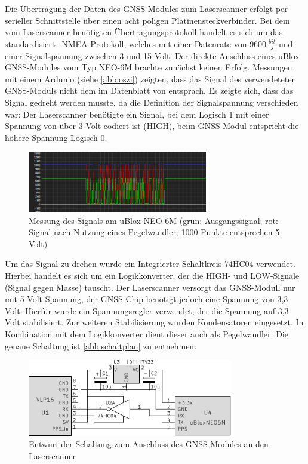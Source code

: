 \documentclass[a4paper,12pt,bibliography=totoc, listof=totoc,titlepage,pointlessnumbers]{scrreprt}
\begin{document}
Die Übertragung der Daten des GNSS-Modules zum Laser\-scan\-ner erfolgt per serieller Schnittstelle über einen acht poligen Platinensteckverbinder. Bei dem vom Laser\-scan\-ner benötigten Übertragungsprotokoll handelt es sich um das standardisierte NMEA-Protokoll, welches mit einer Datenrate von \(9600~\frac{bit}{s}\) und einer Signalspannung zwischen 3 und 15 Volt. Der direkte Anschluss eines uBlox GNSS-Modules vom Typ NEO-6M brachte zunächst keinen Erfolg. Messungen mit einem Ardunio (siehe \autoref{abb:oszi}) zeigten, dass das Signal des verwendeteten GNSS-Moduls nicht dem im Datenblatt von \citet[S. 3]{vlpInterface} entsprach. Es zeigte sich, dass das Signal gedreht werden musste, da die Definition der Signalspannung verschieden war: Der Laser\-scan\-ner benötigte ein Signal, bei dem Logisch 1 mit einer Spannung von über 3 Volt \citep[S. 3]{vlpInterface} codiert ist (HIGH), beim GNSS-Modul entspricht  die höhere Spannung Logisch 0.

\begin{figure}
 \centering
 \includegraphics[width=0.7\textwidth]{img/oszi.png}
 \caption{Messung des Signals am uBlox NEO-6M (grün: Ausgangssignal; rot: Signal nach Nutzung eines Pegelwandler; 1000 Punkte entsprechen 5 Volt)}
 \label{abb:oszi}
\end{figure}

Um das Signal zu drehen wurde ein Integrierter Schaltkreis 74HC04 verwendet. Hierbei handelt es sich um ein Logikkonverter, der die HIGH- und LOW-Signale (Signal gegen Masse) tauscht. Der Laser\-scan\-ner versorgt das GNSS-Modull nur mit 5 Volt Spannung, der GNSS-Chip benötigt jedoch eine Spannung von 3,3 Volt. Hierfür wurde ein Spannungsregler verwendet, der die Spannung auf 3,3 Volt stabilisiert. Zur weiteren Stabilisierung wurden Kondensatoren eingesetzt. In Kombination mit dem Logikkonverter dient dieser auch als Pegelwandler. Die genaue Schaltung ist \autoref{abb:schaltplan} zu entnehmen.

\begin{figure}
 \centering
 \includegraphics[width=0.8\textwidth]{img/schaltplanGnss.pdf}
 \caption{Entwurf der Schaltung zum Anschluss des GNSS-Modules an den Laser\-scan\-ner}
 \label{abb:schaltplan}
\end{figure}
\end{document}
